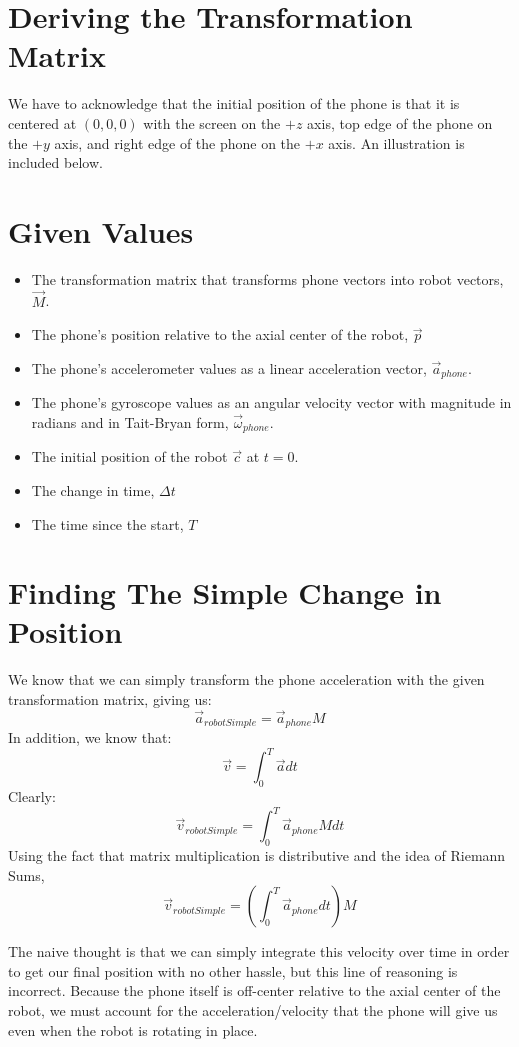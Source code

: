 \documentclass{article}
\begin{document}
\section{Deriving the Transformation Matrix}

We have to acknowledge that the initial position of the phone is that it is centered at $(0, 0, 0)$ with the screen on the $+z$ axis, top edge of the phone on the $+y$ axis, and right edge of the phone on the $+x$ axis. An illustration is included below.

\section{Given Values}
\begin{itemize}
    \item The transformation matrix that transforms phone vectors into robot vectors, $\vec{M}$.
    \item The phone's position relative to the axial center of the robot, $\vec{p}$
    \item The phone's accelerometer values as a linear acceleration vector, $\vec{a}_{phone}$.
    \item The phone's gyroscope values as an angular velocity vector with magnitude in radians and in Tait-Bryan form, $\vec{\omega}_{phone}$.
    \item The initial position of the robot $\vec{c}$ at $t=0$.
    \item The change in time, $\Delta t$
    \item The time since the start, $T$
\end{itemize}

\section{Finding The Simple Change in Position}
We know that we can simply transform the phone acceleration with the given transformation matrix, giving us:
\[
    \vec{a}_{robotSimple} = \vec{a}_{phone} M
\]
In addition, we know that:
\[
    \vec{v} = \int_{0}^{T} \vec{a} dt
\]
Clearly:
\[
    \vec{v}_{robotSimple} = \int_{0}^{T} \vec{a}_{phone} M dt
\]
Using the fact that matrix multiplication is distributive and the idea of Riemann Sums,
\[
    \vec{v}_{robotSimple} = (\int_{0}^{T} \vec{a}_{phone} dt) M
\]

The naive thought is that we can simply integrate this velocity over time in order to get our final position with no other hassle, but this line of reasoning is incorrect. Because the phone itself is off-center relative to the axial center of the robot, we must account for the acceleration/velocity that the phone will give us even when the robot is rotating in place.
\clearpage
\end{document}
